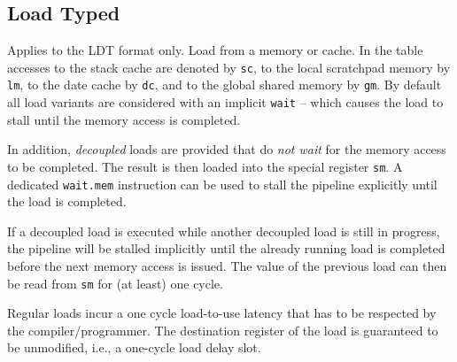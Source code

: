 \documentclass[a4paper,fontsize=10pt,twoside,DIV15,BCOR12mm,headinclude=true,footinclude=false,pagesize,bibtotoc]{scrbook}
\newcommand{\comment}[3]{

\textsf{\textbf{#1}} {\color{#3}#2}}
\newcommand{\martin}[1]{\comment{Martin}{#1}{Blue}}
\newcommand{\stefan}[1]{\comment{Stefan}{#1}{RoyalPurple}}
\renewcommand{\martin}[1]{}
\renewcommand{\stefan}[1]{}
\begin{document}
\stefan{This would be a good thing.
On the other hand, if this also means that this instruction can only be issued as first operation, according to the definition of wait
above, then we cannot read the result of a split load and start the next load in the same cycle.

Are we able to issue two \texttt{mfs} ops in one cycle (e.g., read return base and return offset in the same cycle)?}

\clearpage
\subsection{Load Typed}
\label{subsec:load_typed}

Applies to the LDT format only. Load from a memory or
cache. In the table accesses to the stack cache are denoted by \texttt{sc}, to
the local scratchpad memory by \texttt{lm}, to the date cache by \texttt{dc},
and to the global shared memory by \texttt{gm}. By default all load variants are
considered with an implicit \texttt{wait} -- which causes the load to stall
until the memory access is completed.

In addition, \emph{decoupled} loads are provided that do \emph{not wait} for the
memory access to be completed. The result is then loaded into the special
register \texttt{sm}. A dedicated \texttt{wait.mem} instruction can be used to
stall the pipeline explicitly until the load is completed.

If a decoupled load is executed while another decoupled load is still in
progress, the pipeline will be stalled implicitly until the already running load
is completed before the next memory access is issued. The value of the previous
load can then be read from \texttt{sm} for (at least) one cycle.

Regular loads incur a one cycle load-to-use latency that has
to be respected by the compiler/programmer. The destination register of the load
is guaranteed to be unmodified, i.e., a one-cycle load delay slot.

\martin{There can be different approaches to handle the case where the destination register of load is used in the next clock cycle

1) Ignore the issue, as the compiler will not generate this code. Therefore, we need to avoid this test case.

2) Looking what the hardware does (assume the ALU result of the lws instruction is forwarded) and implementing this in the simulator.

3) Disabling forwarding from the EX stage when the last instruction was a load, but enabling it again when the load instruction is in the MEM stage. That would mean that the 'old' value of the register is used.

4) implement pipeline interlock with a partial stall (or bubble) to allow load/use without a delay slot (like MIPS II I think).

}
\end{document}
